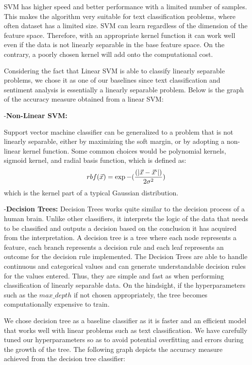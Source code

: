 \documentclass[comsoc,conference]{IEEEtran}
\begin{document}
SVM has higher speed and better performance with a limited number of samples. This makes the algorithm very suitable for text classification problems, where often dataset has a limited size. SVM can learn regardless of the dimension of the feature space. Therefore, with an appropriate kernel function it can work well even if the data is not linearly separable in the base feature space. On the contrary, a poorly chosen kernel will add onto the computational cost. 


Considering the fact that Linear SVM is able to classify linearly separable problems, we chose it as one of our baselines since text classification and sentiment analysis is essentially a linearly separable problem. Below is the graph of the accuracy measure obtained from a linear SVM:

-\textbf{Non-Linear SVM:}

Support vector machine classifier can be generalized to a problem that is not linearly separable, either by maximizing the soft margin, or by adopting a non-linear kernel function. Some common choices would be polynomial kernels, sigmoid kernel, and radial basis function, which is defined as:
\[
rbf(\vec{x}) = \exp{-(\frac{(|\vec{x}-\vec{x}`|)}{2\sigma^2})}
\]
which is the kernel part of a typical Gaussian distribution.

-\textbf{Decision Trees:} Decision Trees works quite similar to the decision process of a human brain. Unlike other classifiers, it interprets the logic of the data that needs to be classified and outputs a decision based on the conclusion it has acquired from the interpretation. A decision tree is a tree where each node represents a feature, each branch represents a decision rule and each leaf represents an outcome for the decision rule implemented. \cite{DT1} The Decision Trees are able to handle continuous and categorical values and can generate understandable decision rules for the values entered. Thus, they are simple and fast as when performing classification of linearly separable data. On the hindsight, if the hyperparameters such as the $max\_depth$ if not chosen appropriately, the tree becomes computationally expensive to train. 


We chose decision tree as a baseline classifier as it is faster and an efficient model that works well with linear problems such as text classification. We have carefully tuned our hyperparameters so as to avoid potential overfitting and errors during the growth of the tree. The following graph depicts the accuracy measure achieved from the decision tree classifier:
\end{document}
